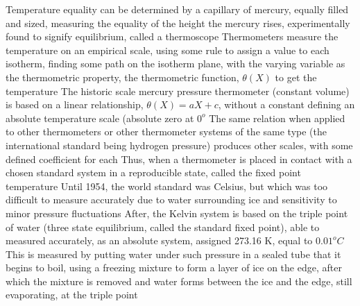 \documentclass[11 pt, twoside]{article}
\newenvironment{outline*}
{
	\begin{outline}[enumerate]
	}
	{\end{outline}
}
\begin{document}
\begin{outline*}
\1 Temperature equality can be determined by a capillary of mercury, equally filled and sized, measuring the equality of the height the mercury rises, experimentally found to signify equilibrium, called a thermoscope
\2 Thermometers measure the temperature on an empirical scale, using some rule to assign a value to each isotherm, finding some path on the isotherm plane, with the varying variable as the thermometric property, the thermometric function, $\theta(X)$ to get the temperature
\2 The historic scale mercury pressure thermometer (constant volume) is based on a linear relationship, $\theta(X) = aX + c$, without a constant defining an absolute temperature scale (absolute zero at $0^o$
\3 The same relation when applied to other thermometers or other thermometer systems of the same type (the international standard being hydrogen pressure) produces other scales, with some defined coefficient for each
\2 Thus, when a thermometer is placed in contact with a chosen standard system in a reproducible state, called the fixed point temperature
\3 Until 1954, the world standard was Celsius, but which was too difficult to measure accurately due to water surrounding ice and sensitivity to minor pressure fluctuations
\3 After, the Kelvin system is based on the triple point of water (three state equilibrium, called the standard fixed point), able to measured accurately, as an absolute system, assigned 273.16 K, equal to $0.01^o C$
\4 This is measured by putting water under such pressure in a sealed tube that it begins to boil, using a freezing mixture to form a layer of ice on the edge, after which the mixture is removed and water forms between the ice and the edge, still evaporating, at the triple point
\end{outline*}
\end{document}
